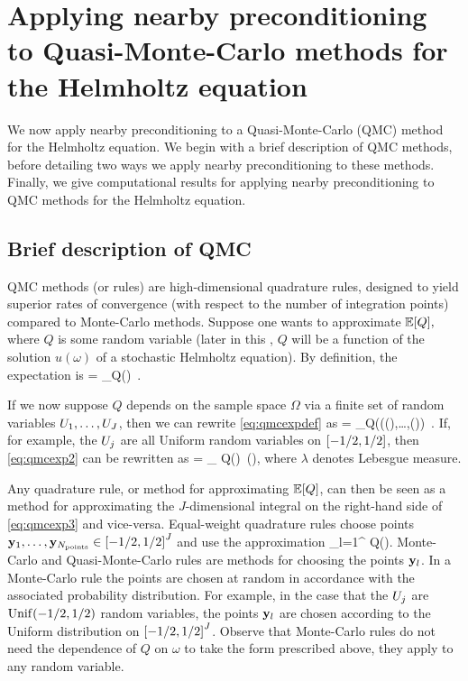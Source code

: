 \section{Applying nearby preconditioning to Quasi-Monte-Carlo methods for the Helmholtz equation}\label{sec:nbpcqmc}

We now apply nearby preconditioning to a Quasi-Monte-Carlo (QMC) method for the Helmholtz equation. We begin with a brief description of QMC methods, before detailing two ways we apply nearby preconditioning to these methods. Finally, we give computational results for applying nearby preconditioning to QMC methods for the Helmholtz equation.

\subsection{Brief description of QMC}

QMC methods (or rules) are high-dimensional quadrature rules, designed to yield superior rates of convergence (with respect to the number of integration points) compared to Monte-Carlo methods. Suppose one wants to approximate $\EXP{Q},$ where $Q$ is some random variable (later in this , $Q$ will be a function of the solution $u(\omega)$ of a stochastic Helmholtz equation). By definition, the expectation is
\beq\label{eq:qmcexpdef}
 = \int_\Omega Q(\omega)\ \ddPPomega.
\eeq

If we now suppose $Q$ depends on the sample space $\Omega$ via a finite set of random variables $U_{1},\ldots,U_{J}$, then we can rewrite \cref{eq:qmcexpdef} as
\beq\label{eq:qmcexp2}
 = \int_\Omega Q\mleft((\Uo(\omega),\ldots,\UJ(\omega)\mright)\, \ddPPomega.
\eeq
If, for example, the $U_{j}$ are all Uniform random variables on $\mleft[-1/2,1/2\mright]$, then \cref{eq:qmcexp2} can be rewritten as
\beq\label{eq:qmcexp3}
 = \int_{} Q\mleft(\by\mright)\, \dd\lambda(\by),
\eeq
where $\lambda$ denotes Lebesgue measure.

Any quadrature rule, or method for approximating $\EXP{Q}$, can then be seen as a method for approximating the $J$-dimensional integral on the right-hand side of \cref{eq:qmcexp3} and vice-versa. Equal-weight quadrature rules choose points $\byo,\ldots,\byNpoints \in \cube{J}$ and use the approximation
\beqs
{} \approx {}\sum_{l=1}^{\Npoints} Q\mleft(\byl\mright).
\eeqs
Monte-Carlo and Quasi-Monte-Carlo rules are methods for choosing the points $\mathbf{y}_{l}$. In a Monte-Carlo rule the points are chosen at random in accordance with the associated probability distribution. For example, in the case that the $U_{j}$ are $\mathrm{Unif}(-1/2,1/2)$ random variables, the points $\mathbf{y}_{l}$ are chosen according to the Uniform distribution on $\cube{J}$. Observe that Monte-Carlo rules do not need the dependence of $Q$ on $\omega$ to take the form prescribed above, they apply to any random variable.


